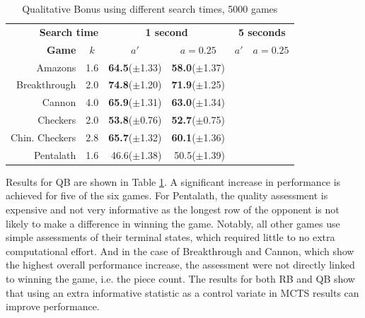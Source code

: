 \documentclass{ecai2014}
\begin{document}
\begin{table}
{\caption{Qualitative Bonus using different search times, 5000 games} \label{tab:qb}}
\begin{center}
\begin{tabular}{rlrrrr}
\hline
\multicolumn{2}{r}{\rule{0pt}{12pt}\textbf{Search time}} & \multicolumn{2}{c}{\textbf{1 second}} & \multicolumn{2}{c}{\textbf{5 seconds}} \\
\cline{1-6}
\rule{0pt}{12pt} \textbf{Game} & \multicolumn{1}{c|}{\textbf{$k$}} 
& \multicolumn{1}{c}{\textbf{$a'$}} & \multicolumn{1}{c}{\textbf{$a = 0.25$}} & \multicolumn{1}{c}{\textbf{$a'$}} & \multicolumn{1}{c}{\textbf{$a = 0.25$}} \\ \hline
Amazons &\multicolumn{1}{l|}{1.6}			& {\bf{64.5}}($\pm$1.33) & {\bf{58.0}}($\pm$1.37) 	&& \\
Breakthrough &\multicolumn{1}{l|}{2.0} 		& {\bf{74.8}}($\pm$1.20) & {\bf{71.9}}($\pm$1.25) 	&& \\
Cannon &\multicolumn{1}{l|}{4.0} 			& {\bf{65.9}}($\pm$1.31) & {\bf{63.0}}($\pm$1.34) 	&& \\
Checkers &\multicolumn{1}{l|}{2.0}			& {\bf{53.8}}($\pm$0.76) & {\bf{52.7}}($\pm$0.75) 	&& \\
Chin. Checkers &\multicolumn{1}{l|}{2.8} 	& {\bf{65.7}}($\pm$1.32) & {\bf{60.1}}($\pm$1.36) 	&& \\
Pentalath &\multicolumn{1}{l|}{1.6} 		& 46.6($\pm$1.38) 	     & 50.5($\pm$1.39) 			&& \\
\hline
\end{tabular}
\end{center}
\end{table}

Results for QB are shown in Table \ref{tab:qb}. A significant increase in performance is achieved for five of the six games. For Pentalath, the quality assessment is expensive and not very informative as the longest row of the opponent is not likely to make a difference in winning the game. Notably, all other games use simple assessments of their terminal states, which required little to no extra computational effort. And in the case of Breakthrough and Cannon, which show the highest overall performance increase, the assessment were not directly linked to winning the game, i.e. the piece count. The results for both RB and QB show that using an extra informative statistic as a control variate in MCTS results can improve performance.

\end{document}

